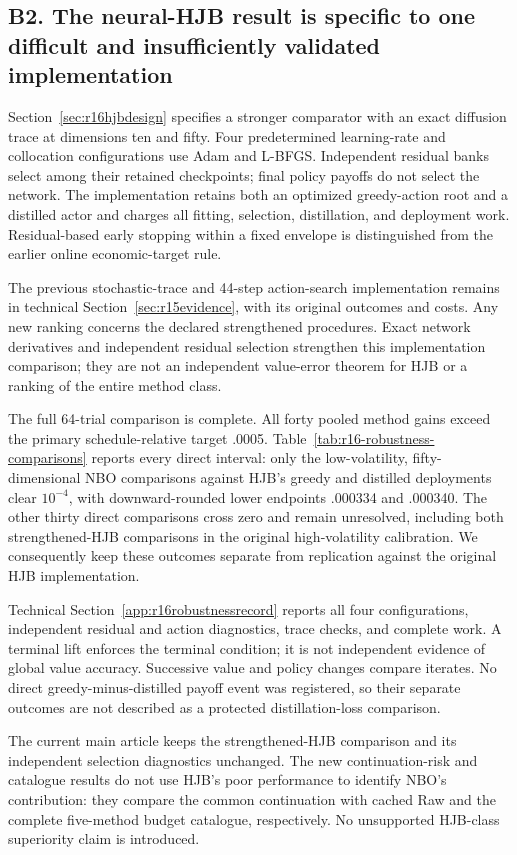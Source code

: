 \subsection*{B2. The neural-HJB result is specific to one difficult and insufficiently validated implementation}\label{resp:B2}
Section~\ref{sec:r16hjbdesign} specifies a stronger comparator with an exact diffusion trace at dimensions ten and fifty. Four predetermined learning-rate and collocation configurations use Adam and L-BFGS. Independent residual banks select among their retained checkpoints; final policy payoffs do not select the network. The implementation retains both an optimized greedy-action root and a distilled actor and charges all fitting, selection, distillation, and deployment work. Residual-based early stopping within a fixed envelope is distinguished from the earlier online economic-target rule.

The previous stochastic-trace and 44-step action-search implementation remains in technical Section~\ref{sec:r15evidence}, with its original outcomes and costs. Any new ranking concerns the declared strengthened procedures. Exact network derivatives and independent residual selection strengthen this implementation comparison; they are not an independent value-error theorem for HJB or a ranking of the entire method class.

The full 64-trial comparison is complete. All forty pooled method gains exceed the primary schedule-relative target .0005. Table~\ref{tab:r16-robustness-comparisons} reports every direct interval: only the low-volatility, fifty-dimensional NBO comparisons against HJB's greedy and distilled deployments clear $10^{-4}$, with downward-rounded lower endpoints .000334 and .000340. The other thirty direct comparisons cross zero and remain unresolved, including both strengthened-HJB comparisons in the original high-volatility calibration. We consequently keep these outcomes separate from replication against the original HJB implementation.

Technical Section~\ref{app:r16robustnessrecord} reports all four configurations, independent residual and action diagnostics, trace checks, and complete work. A terminal lift enforces the terminal condition; it is not independent evidence of global value accuracy. Successive value and policy changes compare iterates. No direct greedy-minus-distilled payoff event was registered, so their separate outcomes are not described as a protected distillation-loss comparison.


The current main article keeps the strengthened-HJB comparison and its independent selection diagnostics unchanged. The new continuation-risk and catalogue results do not use HJB's poor performance to identify NBO's contribution: they compare the common continuation with cached Raw and the complete five-method budget catalogue, respectively. No unsupported HJB-class superiority claim is introduced.

